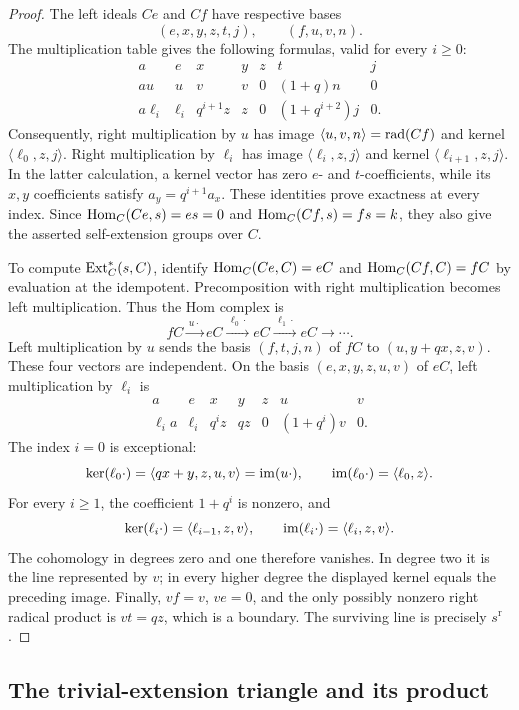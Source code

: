 \begin{proof}
The left ideals $Ce$ and $Cf$ have respective bases
\[
 (e,x,y,z,t,j),\qquad(f,u,v,n).
\]
The multiplication table gives the following formulas, valid for every
$i\geq0$:
\[
\begin{array}{c|cccccc}
 a&e&x&y&z&t&j\\ \hline
 au&u&v&v&0&(1+q)n&0\\
 a\ell_i&\ell_i&q^{i+1}z&z&0&(1+q^{i+2})j&0.
\end{array}
\]
Consequently, right multiplication by $u$ has image
$\langle u,v,n\rangle=\operatorname{rad}(Cf)$ and kernel
$\langle\ell_0,z,j\rangle$. Right multiplication by $\ell_i$ has image
$\langle\ell_i,z,j\rangle$ and kernel
$\langle\ell_{i+1},z,j\rangle$. In the latter calculation, a kernel vector
has zero $e$- and $t$-coefficients, while its $x,y$ coefficients satisfy
$a_y=q^{i+1}a_x$. These identities prove exactness at every index.
Since $\operatorname{Hom}_C(Ce,s)=es=0$ and $\operatorname{Hom}_C(Cf,s)=fs=k$, they also give the
asserted self-extension groups over $C$.

To compute $\operatorname{Ext}_C^*(s,C)$, identify
$\operatorname{Hom}_C(Ce,C)=eC$ and $\operatorname{Hom}_C(Cf,C)=fC$ by evaluation at the idempotent.
Precomposition with right multiplication becomes left multiplication.
Thus the Hom complex is
\[
 fC\xrightarrow{\,u\cdot\,}eC
 \xrightarrow{\,\ell_0\cdot\,}eC
 \xrightarrow{\,\ell_1\cdot\,}eC\longrightarrow\cdots.
\]
Left multiplication by $u$ sends the basis $(f,t,j,n)$ of $fC$ to
$(u,y+qx,z,v)$. These four vectors are independent. On the basis
$(e,x,y,z,u,v)$ of $eC$, left multiplication by $\ell_i$ is
\[
\begin{array}{c|cccccc}
 a&e&x&y&z&u&v\\ \hline
 \ell_i a&\ell_i&q^i z&qz&0&(1+q^i)v&0.
\end{array}
\]
The index $i=0$ is exceptional:
\[
 \ker(\ell_0\cdot)=\langle qx+y,z,u,v\rangle=\operatorname{im}(u\cdot),
 \qquad
 \operatorname{im}(\ell_0\cdot)=\langle\ell_0,z\rangle.
\]
For every $i\geq1$, the coefficient $1+q^i$ is nonzero, and
\[
 \ker(\ell_i\cdot)=\langle\ell_{i-1},z,v\rangle,
 \qquad
 \operatorname{im}(\ell_i\cdot)=\langle\ell_i,z,v\rangle.
\]
The cohomology in degrees zero and one therefore vanishes. In degree two
it is the line represented by $v$; in every higher degree the displayed
kernel equals the preceding image. Finally, $vf=v$, $ve=0$, and the only
possibly nonzero right radical product is $vt=qz$, which is a boundary.
The surviving line is precisely $s^{\mathrm r}$.
\end{proof}

\subsection{The trivial-extension triangle and its product}

